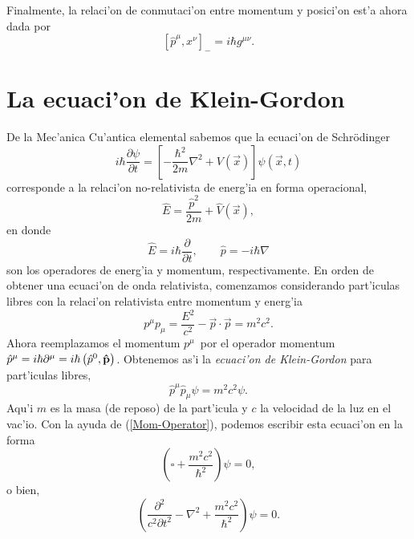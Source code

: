 Finalmente, la relaci'on de conmutaci'on entre momentum y
posici'on est'a ahora dada por 
\begin{equation}
\left[ \hat{p}^{\mu },x^{\nu }\right] _{-}=i\hbar g^{\mu \nu }.
\label{conmuta}
\end{equation}

\section{La ecuaci'on de Klein-Gordon}

De la Mec'anica Cu'antica elemental sabemos que la ecuaci'on de
Schr\"{o}dinger 
\begin{equation}
i\hbar \frac{\partial \psi }{\partial t}=\left[ -\frac{\hbar ^{2}}{2m}%
\nabla ^{2}+V\left( \vec{x}\right) \right] \psi \left( \vec{x},t\right)
\end{equation}
corresponde a la relaci'on no-relativista de energ'ia en forma
operacional, 
\begin{equation}
\hat{E}=\frac{\hat{p}^{2}}{2m}+\hat{V}\left( \vec{x}\right) ,
\end{equation}
en donde 
\begin{equation}
\hat{E}=i\hbar \frac{\partial }{\partial t},\qquad \hat{p}=-i\hbar \nabla
\end{equation}
son los operadores de energ'ia y momentum, respectivamente. En orden
de obtener una ecuaci'on de onda relativista, comenzamos considerando
part'iculas libres con la relaci'on relativista entre momentum y
energ'ia 
\begin{equation}
p^{\mu }p_{\mu }=\frac{E^{2}}{c^{2}}-\vec{p}\cdot \vec{p}=m^{2}c^{2}.
\end{equation}
Ahora reemplazamos el momentum $p^{\mu }$\ por el operador momentum $%
\hat{p}^{\mu }=i\hbar \partial ^{\mu }=i\hbar \left( \hat{p}^{0},{\bf %
\hat{p}}\right) $. Obtenemos as'i la \emph{ecuaci'on de Klein-Gordon}
para part'iculas libres, 
\begin{equation}
\hat{p}^{\mu }\hat{p}_{\mu }\psi =m^{2}c^{2}\psi . \label{KG1}
\end{equation}
Aqu'i $m$ es la masa (de reposo) de la part'icula y $c$ la velocidad
de la luz en el vac'io. Con la ayuda de (\ref{Mom-Operator}), podemos
escribir esta ecuaci'on en la forma 
\begin{equation}
\left( \square +\frac{m^{2}c^{2}}{\hbar ^{2}}\right) \psi =0, \label{KG2}
\end{equation}
o bien, 
\begin{equation}
\left( \frac{\partial ^{2}}{c^{2}\partial t^{2}}-\nabla ^{2}+\frac{m^{2}c^{2}%
}{\hbar ^{2}}\right) \psi =0.
\end{equation}
